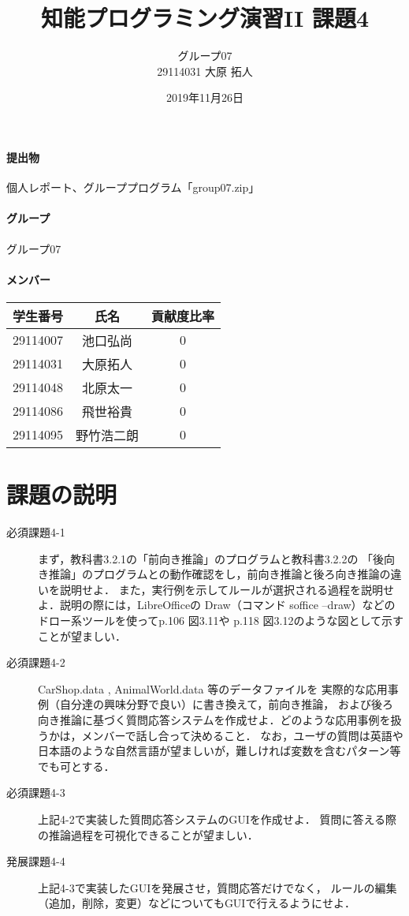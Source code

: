 \documentclass{jarticle}
\title{知能プログラミング演習II 課題4}
\author{グループ07\\
    29114031 大原 拓人\\
}
\date{2019年11月26日}
\begin{document}
\maketitle

\paragraph{提出物} 個人レポート、グループプログラム「group07.zip」
\paragraph{グループ} グループ07
\paragraph{メンバー}
\begin{tabular}{|c|c|c|}
    \hline
    学生番号&氏名&貢献度比率\\
    \hline\hline
    29114007&池口弘尚&0\\
    \hline
    29114031&大原拓人&0\\
    \hline
    29114048&北原太一&0\\
    \hline
    29114086&飛世裕貴&0\\
    \hline
    29114095&野竹浩二朗&0\\
    \hline
\end{tabular}

\section{課題の説明}
\begin{description}
    \item[必須課題4-1] まず，教科書3.2.1の「前向き推論」のプログラムと教科書3.2.2の
    「後向き推論」のプログラムとの動作確認をし，前向き推論と後ろ向き推論の違いを説明せよ．
    また，実行例を示してルールが選択される過程を説明せよ．説明の際には，LibreOfficeの
    Draw（コマンド soffice --draw）などのドロー系ツールを使ってp.106 図3.11や
    p.118 図3.12のような図として示すことが望ましい．
    \item[必須課題4-2] CarShop.data , AnimalWorld.data 等のデータファイルを
    実際的な応用事例（自分達の興味分野で良い）に書き換えて，前向き推論，
    および後ろ向き推論に基づく質問応答システムを作成せよ．どのような応用事例を扱うかは，メンバーで話し合って決めること．
    なお，ユーザの質問は英語や日本語のような自然言語が望ましいが，難しければ変数を含むパターン等でも可とする．
    \item[必須課題4-3] 上記4-2で実装した質問応答システムのGUIを作成せよ．
    質問に答える際の推論過程を可視化できることが望ましい．
    \item[発展課題4-4] 上記4-3で実装したGUIを発展させ，質問応答だけでなく，
    ルールの編集（追加，削除，変更）などについてもGUIで行えるようにせよ．
\end{description}
\end{document}
